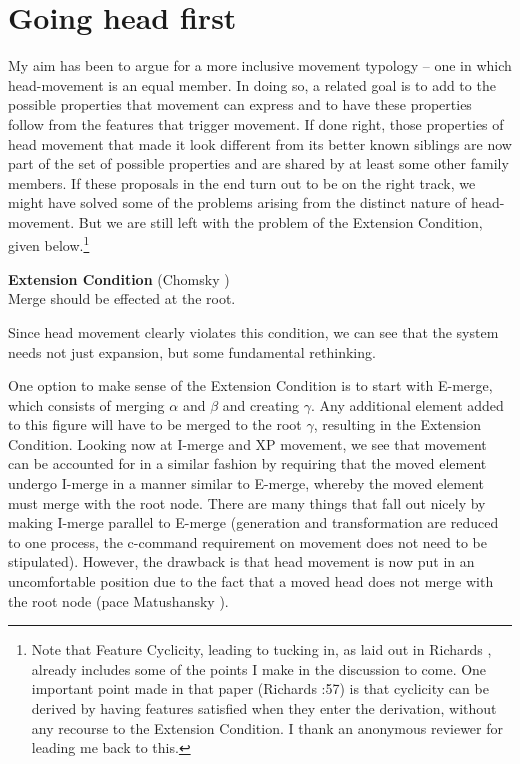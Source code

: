\documentclass[output=paper,colorlinks,citecolor=brown,
]{langscibook}
\begin{document}
\section{Going head first}

My aim has been to argue for a more inclusive movement typology -- one in which head-movement is an equal member.  In doing so, a related goal is to add to the possible properties that movement can express and to have these properties follow from the features that trigger movement.  If done right, those properties of head movement that made it look different from its better known siblings are now part of the set of possible properties and are shared by at least some other family members.  If these proposals in the end turn out to be on the right track, we might have solved  some of the problems arising from the distinct nature of head-movement.  But we are still left with the problem of the Extension Condition, given below.\footnote{Note that Feature Cyclicity, leading to tucking in, as laid out in Richards \citeyearpar{Richards:1997a}, already includes some of the points I make in the discussion to come.  One important point made in that paper (Richards \citeyear{Richards:1997a}:57) is that cyclicity can be derived by having features satisfied when they enter the derivation, without any recourse to the Extension Condition.  I thank an anonymous reviewer for leading me back to this.} 

\ea \textbf{Extension Condition} (Chomsky \citeyear{Chomsky:1995})\\
Merge should be effected at the root.

Since head movement clearly violates this condition, we can see that the system needs not just expansion, but some fundamental rethinking.  

One option to make sense of the Extension Condition is to start with E-merge, which consists of merging $\alpha$ and $\beta$ and creating $\gamma$. Any additional element added to this figure will have to be merged to the root $\gamma$, resulting in the Extension Condition. Looking now at I-merge and XP movement, we see that movement can be accounted for in a similar fashion by requiring that the moved element undergo I-merge in a manner similar to E-merge, whereby the moved element must merge with the root node.  There are many things that fall out nicely by making I-merge parallel to E-merge (generation and transformation are reduced to one process, the c-command requirement on movement does not need to be stipulated).  However, the drawback is that head movement is now put in an uncomfortable position due to the fact that a moved head does not merge with the root node (pace Matushansky \citeyear{Matushansky:2006}).
\end{document}
